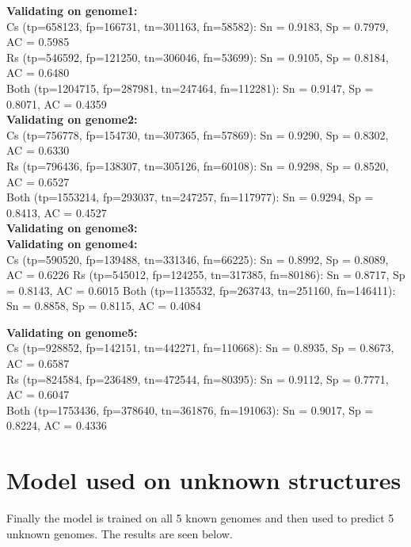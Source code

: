 \documentclass[paper=a4, fontsize=11pt]{scrartcl} %
\numberwithin{equation}{section} %
\numberwithin{figure}{section} %
\numberwithin{table}{section} %
\begin{document}
\textbf{Validating on genome1:} \\
Cs   (tp=658123, fp=166731, tn=301163, fn=58582): Sn = 0.9183, Sp = 0.7979, AC = 0.5985 \\
Rs   (tp=546592, fp=121250, tn=306046, fn=53699): Sn = 0.9105, Sp = 0.8184, AC = 0.6480 \\
Both (tp=1204715, fp=287981, tn=247464, fn=112281): Sn = 0.9147, Sp = 0.8071, AC = 0.4359 \\

\textbf{Validating on genome2:} \\
Cs   (tp=756778, fp=154730, tn=307365, fn=57869): Sn = 0.9290, Sp = 0.8302, AC = 0.6330 \\
Rs   (tp=796436, fp=138307, tn=305126, fn=60108): Sn = 0.9298, Sp = 0.8520, AC = 0.6527 \\
Both (tp=1553214, fp=293037, tn=247257, fn=117977): Sn = 0.9294, Sp = 0.8413, AC = 0.4527 \\


\textbf{Validating on genome3:} \\


\textbf{Validating on genome4:} \\
Cs   (tp=590520, fp=139488, tn=331346, fn=66225): Sn = 0.8992, Sp = 0.8089, AC = 0.6226
Rs   (tp=545012, fp=124255, tn=317385, fn=80186): Sn = 0.8717, Sp = 0.8143, AC = 0.6015
Both (tp=1135532, fp=263743, tn=251160, fn=146411): Sn = 0.8858, Sp = 0.8115, AC = 0.4084

\textbf{Validating on genome5:} \\
Cs   (tp=928852, fp=142151, tn=442271, fn=110668): Sn = 0.8935, Sp = 0.8673, AC = 0.6587 \\
Rs   (tp=824584, fp=236489, tn=472544, fn=80395): Sn = 0.9112, Sp = 0.7771, AC = 0.6047 \\
Both (tp=1753436, fp=378640, tn=361876, fn=191063): Sn = 0.9017, Sp = 0.8224, AC = 0.4336 \\

\section{Model used on unknown structures}
Finally the model is trained on all 5 known genomes and then used to predict 5 unknown genomes. The results are seen below. 

\end{document}

